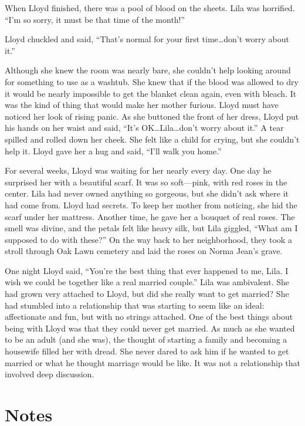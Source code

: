 \documentclass[
  letterpaper,
]{book}
\begin{document}
When Lloyd finished, there was a pool of blood on the sheets. Lila was
horrified. ``I'm so sorry, it must be that time of the month!''

Lloyd chuckled and said, ``That's normal for your first time\ldots don't
worry about it.''

Although she knew the room was nearly bare, she couldn't help looking
around for something to use as a washtub. She knew that if the blood was
allowed to dry it would be nearly impossible to get the blanket clean
again, even with bleach. It was the kind of thing that would make her
mother furious. Lloyd must have noticed her look of rising panic. As she
buttoned the front of her dress, Lloyd put his hands on her waist and
said, ``It's OK\ldots Lila\ldots don't worry about it.'' A tear spilled
and rolled down her cheek. She felt like a child for crying, but she
couldn't help it. Lloyd gave her a hug and said, ``I'll walk you home.''

For several weeks, Lloyd was waiting for her nearly every day. One day
he surprised her with a beautiful scarf. It was so soft---pink, with red
roses in the center. Lila had never owned anything so gorgeous, but she
didn't ask where it had come from. Lloyd had secrets. To keep her mother
from noticing, she hid the scarf under her mattress. Another time, he
gave her a bouquet of real roses. The smell was divine, and the petals
felt like heavy silk, but Lila giggled, ``What am I supposed to do with
these?'' On the way back to her neighborhood, they took a stroll through
Oak Lawn cemetery and laid the roses on Norma Jean's grave.

One night Lloyd said, ``You're the best thing that ever happened to me,
Lila. I wish we could be together like a real married couple.'' Lila was
ambivalent. She had grown very attached to Lloyd, but did she really
want to get married? She had stumbled into a relationship that was
starting to seem like an ideal: affectionate and fun, but with no
strings attached. One of the best things about being with Lloyd was that
they could never get married. As much as she wanted to be an adult (and
she was), the thought of starting a family and becoming a housewife
filled her with dread. She never dared to ask him if he wanted to get
married or what he thought marriage would be like. It was not a
relationship that involved deep discussion.

\section{Notes}\label{notes-24}
\end{document}
